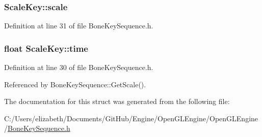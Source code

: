\subsubsection[{\texorpdfstring{scale}{scale}}]{ Scale\+Key\+::scale}\hypertarget{struct_scale_key_a49c1e61733ade0134fb94a62620d2caf}{}\label{struct_scale_key_a49c1e61733ade0134fb94a62620d2caf}


Definition at line 31 of file Bone\+Key\+Sequence.\+h.

\subsubsection[{\texorpdfstring{time}{time}}]{\setlength{\rightskip}{0pt plus 5cm}float Scale\+Key\+::time}\hypertarget{struct_scale_key_a5fc8b5f2ab58d62addddbb51a794fee7}{}\label{struct_scale_key_a5fc8b5f2ab58d62addddbb51a794fee7}


Definition at line 30 of file Bone\+Key\+Sequence.\+h.



Referenced by Bone\+Key\+Sequence\+::\+Get\+Scale().



The documentation for this struct was generated from the following file\+:\begin{DoxyCompactItemize}
\item 
C\+:/\+Users/elizabeth/\+Documents/\+Git\+Hub/\+Engine/\+Open\+G\+L\+Engine/\+Open\+G\+L\+Engine/\hyperlink{_bone_key_sequence_8h}{Bone\+Key\+Sequence.\+h}\end{DoxyCompactItemize}
